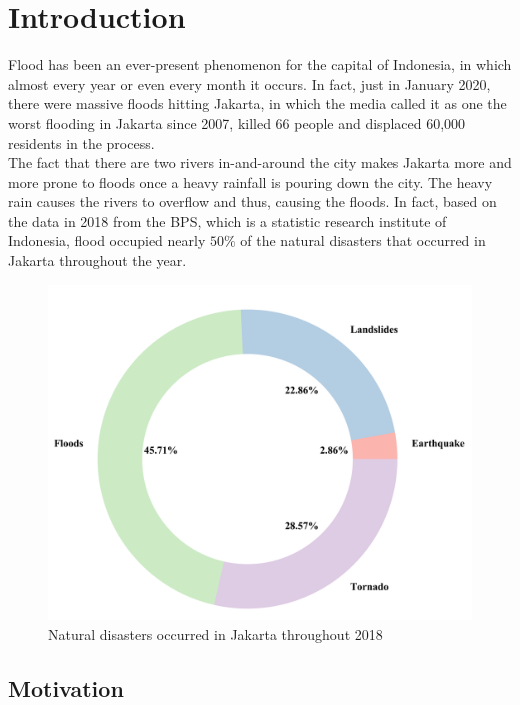 \chapter{Introduction}

Flood has been an ever-present phenomenon for the capital of Indonesia, in which almost every year or even every month it occurs. In fact, just in January 2020, there were massive floods hitting Jakarta, in which the media called it as one the worst flooding in Jakarta since 2007, killed  66 people and displaced 60,000 residents in the process.\\

\noindent
The fact that there are two rivers in-and-around the city makes Jakarta more and more prone to floods once a heavy rainfall is pouring down the city. The heavy rain causes the rivers to overflow and thus, causing the floods. In fact, based on the data in 2018 from the BPS, which is a statistic research institute of Indonesia, flood occupied nearly $50\%$ of the natural disasters that occurred in Jakarta throughout the year.\\

\begin{figure}
\begin{center}
\graphicspath{ {./Pict/} }
\includegraphics[scale=0.15]{foo.png}
\caption{Natural disasters occurred in Jakarta throughout 2018}
\end{center}
\end{figure}

\section{Motivation}

